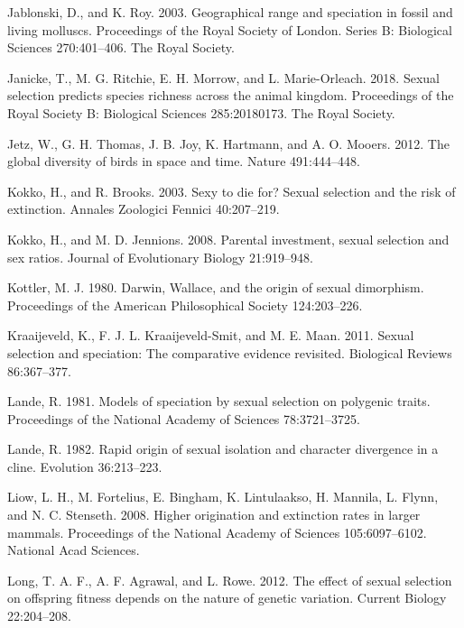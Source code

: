 \documentclass[]{article}
\begin{document}
\leavevmode\hypertarget{ref-Jablonski_2003}{}%
Jablonski, D., and K. Roy. 2003. Geographical range and speciation in
fossil and living molluscs. Proceedings of the Royal Society of London.
Series B: Biological Sciences 270:401--406. The Royal Society.

\leavevmode\hypertarget{ref-Janicke_2018}{}%
Janicke, T., M. G. Ritchie, E. H. Morrow, and L. Marie-Orleach. 2018.
Sexual selection predicts species richness across the animal kingdom.
Proceedings of the Royal Society B: Biological Sciences 285:20180173.
The Royal Society.

\leavevmode\hypertarget{ref-Jetz_2012}{}%
Jetz, W., G. H. Thomas, J. B. Joy, K. Hartmann, and A. O. Mooers. 2012.
The global diversity of birds in space and time. Nature 491:444--448.

\leavevmode\hypertarget{ref-Kokko_Brooks_2003}{}%
Kokko, H., and R. Brooks. 2003. Sexy to die for? Sexual selection and
the risk of extinction. Annales Zoologici Fennici 40:207--219.

\leavevmode\hypertarget{ref-Kokko_Jennions2008}{}%
Kokko, H., and M. D. Jennions. 2008. Parental investment, sexual
selection and sex ratios. Journal of Evolutionary Biology 21:919--948.

\leavevmode\hypertarget{ref-Kottler_1980}{}%
Kottler, M. J. 1980. Darwin, Wallace, and the origin of sexual
dimorphism. Proceedings of the American Philosophical Society
124:203--226.

\leavevmode\hypertarget{ref-Kraaijeveld_2011}{}%
Kraaijeveld, K., F. J. L. Kraaijeveld-Smit, and M. E. Maan. 2011. Sexual
selection and speciation: The comparative evidence revisited. Biological
Reviews 86:367--377.

\leavevmode\hypertarget{ref-Lande_1981}{}%
Lande, R. 1981. Models of speciation by sexual selection on polygenic
traits. Proceedings of the National Academy of Sciences 78:3721--3725.

\leavevmode\hypertarget{ref-Lande_1982}{}%
Lande, R. 1982. Rapid origin of sexual isolation and character
divergence in a cline. Evolution 36:213--223.

\leavevmode\hypertarget{ref-Liow_2008}{}%
Liow, L. H., M. Fortelius, E. Bingham, K. Lintulaakso, H. Mannila, L.
Flynn, and N. C. Stenseth. 2008. Higher origination and extinction rates
in larger mammals. Proceedings of the National Academy of Sciences
105:6097--6102. National Acad Sciences.

\leavevmode\hypertarget{ref-Long_2012}{}%
Long, T. A. F., A. F. Agrawal, and L. Rowe. 2012. The effect of sexual
selection on offspring fitness depends on the nature of genetic
variation. Current Biology 22:204--208.
\end{document}
